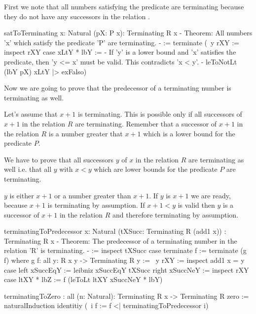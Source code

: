 First we note that all numbers satisfying the predicate  are terminating
because they do not have any successors in the relation .

\begin{alba}
    satToTerminating {x: Natural} (pX: P x): Terminating R x
    {- Theorem: All numbers 'x' which satisfy the predicate 'P' are
       terminating. -}
    :=
        terminate
            (\ {y} rXY :=
                inspect rXY case
                    xLtY * lbY :=
                        {- If 'y' is a lower bound and 'x' satisfies the
                           predicate, then 'y <= x' must be valid. This
                           contradicts 'x < y'. -}
                        leToNotLt (lbY pX) xLtY |> exFalso)
\end{alba}



Now we are going to prove that the predecessor of a terminating number is
terminating as well.

Let's assume that $x + 1$ is terminating. This is possible only if all
successors of $x + 1$ in the relation $R$ are terminating. Remember that a
successor of $x + 1$ in the relation $R$ is a number greater that $x + 1$ which
is a lower bound for the predicate $P$.

We have to prove that all successors $y$ of $x$ in the relation $R$ are
terminating as well i.e. that all $y$ with $x < y$ which are lower bounds for
the predicate $P$ are terminating.

$y$ is either $x + 1$ or a number greater than $x + 1$. If $y$ is $x + 1$ we are
ready, because $x + 1$ is terminating by assumption. If $x + 1 < y$ is valid
then $y$ is a successor of $x + 1$ in the relation $R$ and therefore terminating
by assumption.
%
\begin{alba}
    terminatingToPredecessor
        {x: Natural}
        (tXSucc: Terminating R (add1 x))
        : Terminating R x
    {- Theorem: The predecessor of a terminating number in the relation 'R'
       is terminating. -}
    :=
        inspect tXSucc case
            terminate f :=
                terminate (g f)
        where
            g f: all {y}: R x y -> Terminating R y :=
                \ {y} rXY :=
                    inspect add1 x = y case
                        left xSuccEqY :=
                            leibniz xSuccEqY tXSucc
                        right xSuccNeY :=
                            inspect rXY case
                                ltXY * lbZ :=
                                    f (leToLt ltXY xSuccNeY * lbY)

    terminatingToZero
        : all (n: Natural): Terminating R x -> Terminating R zero
    :=
        naturalInduction
            identitiy
            (\ i f := f <| terminatingToPredecessor i)
\end{alba}

